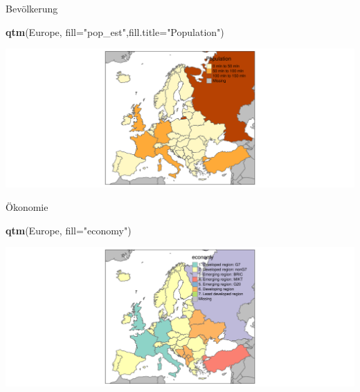 \documentclass[ignorenonframetext,]{beamer}
\newenvironment{Shaded}{\begin{snugshade}}{\end{snugshade}}
\newcommand{\DataTypeTok}[1]{\textcolor[rgb]{0.13,0.29,0.53}{#1}}
\newcommand{\KeywordTok}[1]{\textcolor[rgb]{0.13,0.29,0.53}{\textbf{#1}}}
\newcommand{\NormalTok}[1]{#1}
\newcommand{\StringTok}[1]{\textcolor[rgb]{0.31,0.60,0.02}{#1}}
\begin{document}
\begin{frame}[fragile]{Bevölkerung}
\protect\hypertarget{bevolkerung-1}{}

\begin{Shaded}
\begin{Highlighting}[]
\KeywordTok{qtm}\NormalTok{(Europe, }\DataTypeTok{fill=}\StringTok{"pop_est"}\NormalTok{,}\DataTypeTok{fill.title=}\StringTok{"Population"}\NormalTok{) }
\end{Highlighting}
\end{Shaded}

\includegraphics{A4_tmap_files/figure-beamer/unnamed-chunk-18-1.pdf}

\end{frame}

\begin{frame}[fragile]{Ökonomie}
\protect\hypertarget{okonomie}{}

\begin{Shaded}
\begin{Highlighting}[]
\KeywordTok{qtm}\NormalTok{(Europe, }\DataTypeTok{fill=}\StringTok{"economy"}\NormalTok{) }
\end{Highlighting}
\end{Shaded}

\includegraphics{A4_tmap_files/figure-beamer/unnamed-chunk-20-1.pdf}

\end{frame}
\end{document}
